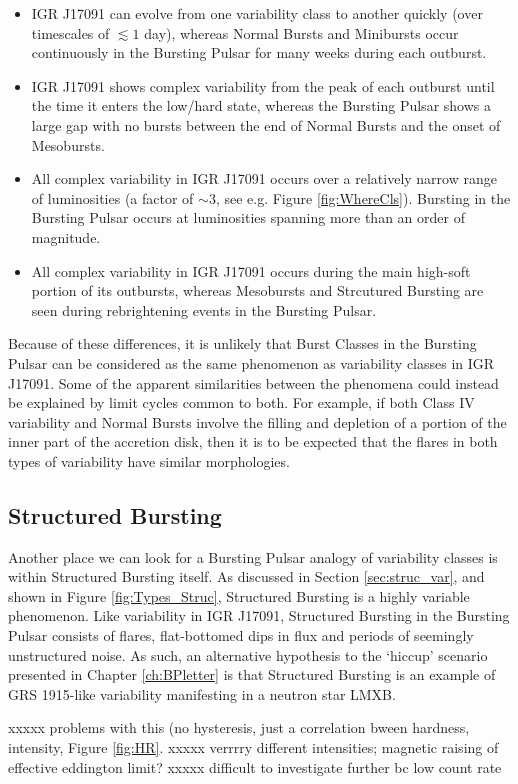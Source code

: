 \begin{itemize}
\item IGR J17091 can evolve from one variability class to another quickly (over timescales of $\lesssim1$ day), whereas Normal Bursts and Minibursts occur continuously in the Bursting Pulsar for many weeks during each outburst.
\item IGR J17091 shows complex variability from the peak of each outburst until the time it enters the low/hard state, whereas the Bursting Pulsar shows a large gap with no bursts between the end of Normal Bursts and the onset of Mesobursts.
\item All complex variability in IGR J17091 occurs over a relatively narrow range of luminosities (a factor of $\sim3$, see e.g. Figure \ref{fig:WhereCls}).  Bursting in the Bursting Pulsar occurs at luminosities spanning more than an order of magnitude.
\item All complex variability in IGR J17091 occurs during the main high-soft portion of its outbursts, whereas Mesobursts and Strcutured Bursting are seen during rebrightening events in the Bursting Pulsar.
\end{itemize}

Because of these differences, it is unlikely that Burst Classes in the Bursting Pulsar can be considered as the same phenomenon as variability classes in IGR J17091.  Some of the apparent similarities between the phenomena could instead be explained by limit cycles common to both.  For example, if both Class IV variability and Normal Bursts involve the filling and depletion of a portion of the inner part of the accretion disk, then it is to be expected that the flares in both types of variability have similar morphologies.

\subsection{Structured Bursting}

\par Another place we can look for a Bursting Pulsar analogy of variability classes is within Structured Bursting itself.  As discussed in Section \ref{sec:struc_var}, and shown in Figure \ref{fig:Types_Struc}, Structured Bursting is a highly variable phenomenon.  Like variability in IGR J17091, Structured Bursting in the Bursting Pulsar consists of flares, flat-bottomed dips in flux and periods of seemingly unstructured noise.  As such, an alternative hypothesis to the `hiccup' scenario presented in Chapter \ref{ch:BPletter} is that Structured Bursting is an example of GRS 1915-like variability manifesting in a neutron star LMXB.
\par xxxxx problems with this (no hysteresis, just a correlation bween hardness, intensity, Figure \ref{fig:HR}.  xxxxx verrrry different intensities; magnetic raising of effective eddington limit?  xxxxx difficult to investigate further bc low count rate